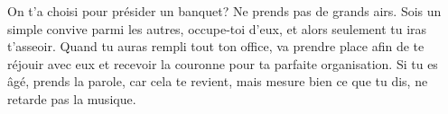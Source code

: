 On t’a choisi pour présider un banquet?
	Ne prends pas de grands airs.
Sois un simple convive parmi les autres, occupe-toi d’eux,
	et alors seulement tu iras t’asseoir.
Quand tu auras rempli tout ton office,
	va prendre place afin de te réjouir avec eux
	et recevoir la couronne pour ta parfaite organisation.
Si tu es âgé, prends la parole, car cela te revient,
	mais mesure bien ce que tu dis, ne retarde pas la musique.
